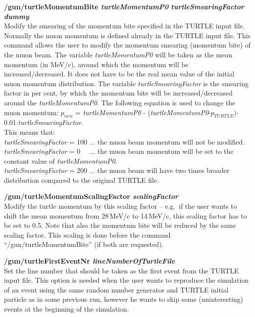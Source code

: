 \documentclass[twoside]{dis04}
\begin{document}
\begin{description}
\item{\bf /gun/turtleMomentumBite \emph{turtleMomentumP0} \emph{turtleSmearingFactor} \emph{dummy} }\\
	Modify the smearing of the momentum bite specified in the TURTLE input file.  
	Normally the muon momentum is defined already in the TURTLE input file.  This command allows the user
	to modify the momentum smearing (momentum bite) of the muon beam.
	The variable \emph{turtleMomentumP0} will be taken as the mean momentum (in MeV/c), around which
	the momentum will be increased/decreased. It does not have to be the real mean value of the initial muon momentum distribution.
        The variable \emph{turtleSmearingFactor} is the smearing factor in per cent, by which the momentum bite
	will be increased/decreased around the \emph{turtleMomentumP0}.  The following equation is used to change the
	muon momentum: $p_{new}$ = {\it turtleMomentumP0} - ({\it turtleMomentumP0}-$p_{TURTLE}$)$\cdot$0.01$\cdot${\it turtleSmearingFactor}.\\
	This means that:\\
	{\it turtleSmearingFactor} = 100 ... the muon beam momentum will not be modified.\\
	{\it turtleSmearingFactor} = 0 ~~... the muon beam momentum will be set to the constant value of {\it turtleMomentumP0}.\\
	{\it turtleSmearingFactor} = 200 ... the muon beam will have two times broader distribution compared to the original TURTLE file.

\item{\bf /gun/turtleMomentumScalingFactor \emph{scalingFactor} }\\
        Modify the turtle momentum by this scaling factor -- e.g.\ if the user wants to shift
	the mean momentum from 28\,MeV/c to 14\,MeV/c, this scaling factor has to be set to 0.5.
	Note that also the momentum bite will be reduced by the same scaling factor.
	This scaling is done before the command ``/gun/turtleMomentumBite'' (if both are
	requested).

\item{\bf /gun/turtleFirstEventNr \emph{lineNumberOfTurtleFile} }\\
	Set the line number that should be taken as the first event from the TURTLE input file.
	This option is needed when the user wants to reproduce the simulation of an event
        using the same random number generator and TURTLE initial particle as in some previous
        run, however he wants to skip some (uninteresting) events at the beginning of the simulation.


\end{description}
\end{document}
